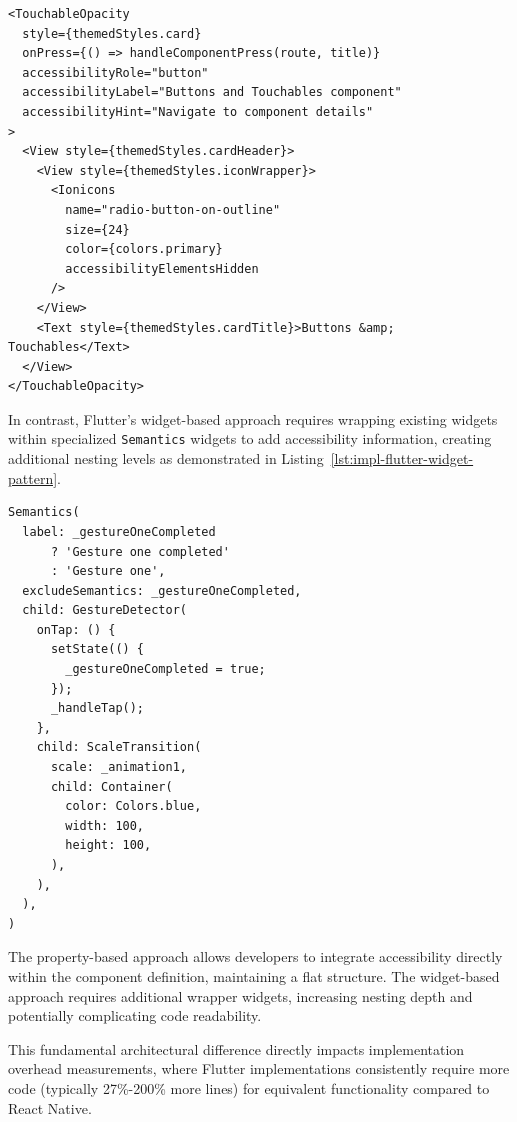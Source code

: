 \begin{lstlisting}[style=ReactNativeStyle, caption=Property-based accessibility pattern in React Native, label=lst:impl-react-native-property-pattern]
<TouchableOpacity
  style={themedStyles.card}
  onPress={() => handleComponentPress(route, title)}
  accessibilityRole="button"
  accessibilityLabel="Buttons and Touchables component"
  accessibilityHint="Navigate to component details"
>
  <View style={themedStyles.cardHeader}>
    <View style={themedStyles.iconWrapper}>
      <Ionicons
        name="radio-button-on-outline"
        size={24}
        color={colors.primary}
        accessibilityElementsHidden
      />
    </View>
    <Text style={themedStyles.cardTitle}>Buttons &amp; Touchables</Text>
  </View>
</TouchableOpacity>
\end{lstlisting}

\FloatBarrier

In contrast, Flutter's widget-based approach requires wrapping existing widgets within specialized \texttt{Semantics} widgets to add accessibility information, creating additional nesting levels as demonstrated in Listing~\ref{lst:impl-flutter-widget-pattern}.

\begin{lstlisting}[style=DartStyle, caption=Widget-based accessibility pattern in Flutter, label=lst:impl-flutter-widget-pattern]
Semantics(
  label: _gestureOneCompleted 
      ? 'Gesture one completed' 
      : 'Gesture one',
  excludeSemantics: _gestureOneCompleted,
  child: GestureDetector(
    onTap: () {
      setState(() {
        _gestureOneCompleted = true;
      });
      _handleTap();
    },
    child: ScaleTransition(
      scale: _animation1,
      child: Container(
        color: Colors.blue,
        width: 100,
        height: 100,
      ),
    ),
  ),
)
\end{lstlisting}

\FloatBarrier

The property-based approach allows developers to integrate accessibility directly within the component definition, maintaining a flat structure. The widget-based approach requires additional wrapper widgets, increasing nesting depth and potentially complicating code readability.

This fundamental architectural difference directly impacts implementation overhead measurements, where Flutter implementations consistently require more code (typically 27\%-200\% more lines) for equivalent functionality compared to React Native.

